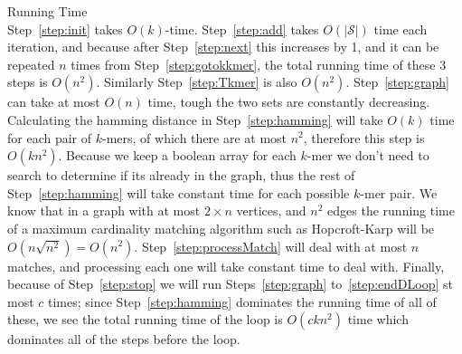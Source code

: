 \documentclass[11pt, oneside]{article}   	%
\newcommand{\kmer}{$k$-mer\xspace}
\newcommand{\kmers}{\kmer{}s\xspace}
\begin{document}
{\Large Running Time}\\
Step~\ref{step:init} takes $O(k)$-time. 
Step~\ref{step:add} takes $O(|\mathcal{S}|)$ time each iteration, and because after Step~\ref{step:next} this increases by 1, and it can be repeated $n$ times from Step~\ref{step:gotokkmer}, the total running time of these 3 steps is $O(n^2)$.
Similarly Step~\ref{step:Tkmer} is also $O(n^2)$. 
Step~\ref{step:graph} can take at most $O(n)$ time, tough the two sets are constantly decreasing. 
Calculating the hamming distance in Step~\ref{step:hamming} will take $O(k)$ time for each pair of \kmers, of which there are at most $n^2$, therefore this step is $O(kn^2)$.
Because we keep a boolean array for each \kmer we don't need to search to determine if its already in the graph, thus the rest of Step~\ref{step:hamming} will take constant time for each possible \kmer pair. 
We know that in a graph with at most $2\times n$ vertices, and $n^2$ edges the running time of a maximum cardinality matching algorithm such as Hopcroft-Karp will be $O(n \sqrt{n^2}) = O(n^2)$.
Step~\ref{step:processMatch} will deal with at most $n$ matches, and processing each one will take constant time to deal with. 
Finally, because of Step~\ref{step:stop} we will run Steps~\ref{step:graph} to~\ref{step:endDLoop} st most $c$ times; 
since Step~\ref{step:hamming} dominates the running time of all of these, 
we see the total running time of the loop is $O(ckn^2)$ time which dominates all of the steps before the loop. 
\end{document}
